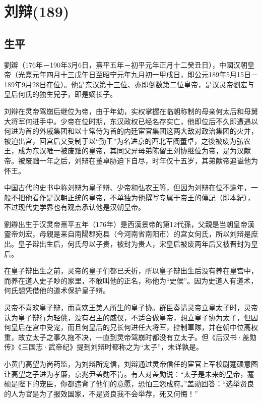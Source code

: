 
\section{刘辩\tiny(189)}

\subsection{生平}

劉辯（176年－190年3月6日，熹平五年－初平元年正月十二癸丑日），中國汉朝皇帝（光熹元年四月十三戊午日至昭宁元年九月初一甲戌日，即公元189年5月15日－189年9月28日在位）。他是东汉第十三位、亦即倒数第二位皇帝，是汉灵帝劉宏与皇后何氏的独生兒子，即是嫡长子。

刘辩在灵帝驾崩后继位为帝，由于年幼，实权掌握在临朝称制的母亲何太后和母舅大将军何进手中。少帝在位时期，东汉政权已经名存实亡，他即位后不久即遭遇以何进为首的外戚集团和以十常侍为首的内廷宦官集团这两大敌对政治集团的火并，被迫出宫，回宫后又受制于以“勤王”为名进京的西北军阀董卓，之後被废为弘农王，成为东汉唯一被废黜的皇帝，其同父异母弟陈留王刘协继位为帝，是为汉献帝。被废黜一年之后，刘辩在董卓胁迫下自尽，时年仅十五岁，其弟献帝追谥他为怀王。

中国古代的史书中称刘辩为皇子辩、少帝和弘农王等，但因为刘辩在位不逾年，一般不把他看作是汉朝正统的皇帝，不单独为他撰写专属于帝王的傳記（即本紀），不过现代史学界也有观点承认他是汉朝皇帝。

劉辯出生于汉灵帝熹平五年（176年）是西漢景帝的第12代孫，父親是当朝皇帝漢靈帝刘宏，母親是来自南陽郡宛县（今河南省南阳市）的宫女何氏，所以刘辩是庶出。皇子辩出生后，何氏母以子贵，被封为贵人，宋皇后被废两年后又被晋封为皇后。

在皇子辩出生之前，灵帝的皇子们都已夭折，所以皇子辩出生后没有养在皇宫中，而养在道人史子眇的家里，不敢叫他的正名，称他为“史侯”。因为史道人有道术，何氏想凭借他的道术保护皇子辩。

灵帝不喜欢皇子辩，而喜欢王美人所生的皇子协。群臣奏请灵帝立皇太子时，灵帝认为皇子辩行为轻佻，没有君主的威仪，不适合做皇帝，想立皇子协为太子，但因何皇后在宫中受宠，而且何皇后的兄长何进任大将军，控制軍隊，并在朝中位高权重，故立太子之事久拖不决，一直到灵帝驾崩时都没有立太子。但《后汉书·盖勋传》《三国志·武帝纪》提到刘辩时都称之为“太子”，未详孰是。

小黄门高望为尚药监，为刘辩所宠信，刘辩通过灵帝信任的宦官上军校尉蹇硕意图让高望之子进为孝廉，京兆尹盖勋不肯。有人对盖勋说：“太子是未来的皇帝，蹇硕是陛下的宠臣，你都违背了他们的意愿，恐怕三怨成府。”盖勋回答：“选举贤良的人为官是为了报效国家，不是贤良我不会举荐，死又何悔！”

